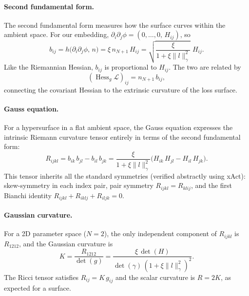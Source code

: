\documentclass{article}
\newcommand{\loss}{\mathcal{L}}
\begin{document}
\paragraph{Second fundamental form.}
The second fundamental form measures how the surface curves
within the ambient space.
For our embedding, $\partial_i\partial_j\phi = (0,\ldots,0,\,H_{ij})$,
so
\begin{equation}\label{eq:sff}
    b_{ij}
    = h\bigl(\partial_i\partial_j\phi,\,n\bigr)
    = \xi\,n_{N+1}\,H_{ij}
    = \sqrt{\frac{\xi}{1+\xi\|l\|_\gamma^2}}\;H_{ij}.
\end{equation}
Like the Riemannian Hessian, $b_{ij}$ is proportional to $H_{ij}$.
The two are related by
\begin{equation}\label{eq:sff-hess}
    (\operatorname{Hess}_g\loss)_{ij} = n_{N+1}\,b_{ij},
\end{equation}
connecting the covariant Hessian to the extrinsic curvature of the
loss surface.

\paragraph{Gauss equation.}
For a hypersurface in a flat ambient space, the Gauss equation
expresses the intrinsic Riemann curvature tensor entirely in terms
of the second fundamental form:
\begin{equation}\label{eq:gauss}
    R_{ijkl}
    = b_{ik}\,b_{jl} - b_{il}\,b_{jk}
    = \frac{\xi}{1+\xi\|l\|_\gamma^2}
      \bigl(H_{ik}\,H_{jl} - H_{il}\,H_{jk}\bigr).
\end{equation}
This tensor inherits all the standard symmetries
(verified abstractly using xAct):
skew-symmetry in each index pair,
pair symmetry $R_{ijkl}=R_{klij}$,
and the first Bianchi identity
$R_{ijkl}+R_{iklj}+R_{iljk}=0$.

\paragraph{Gaussian curvature.}
For a 2D parameter space ($N=2$), the only independent component of
$R_{ijkl}$ is $R_{1212}$, and the Gaussian curvature is
\begin{equation}\label{eq:gauss-curv}
    K = \frac{R_{1212}}{\det(g)}
    = \frac{\xi\,\det(H)}{\det(\gamma)\,(1+\xi\|l\|_\gamma^2)^2}.
\end{equation}
The Ricci tensor satisfies $R_{ij} = K\,g_{ij}$ and the scalar
curvature is $R = 2K$, as expected for a surface.
\end{document}
